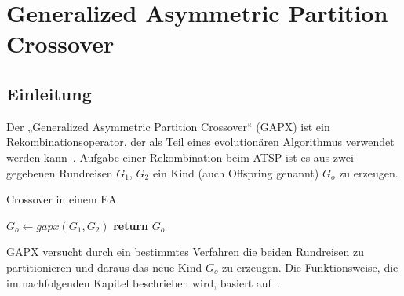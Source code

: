 \chapter{Generalized Asymmetric Partition Crossover}

\label{gapx_einleitung}
\section{Einleitung}
Der „Generalized Asymmetric Partition Crossover“ (GAPX) ist ein
Rekombinationsoperator, der als Teil eines evolutionären Algorithmus
verwendet werden kann~\cite{gapx}. Aufgabe einer Rekombination beim ATSP ist es aus
zwei gegebenen Rundreisen $G_1$, $G_2$ ein Kind (auch Offspring genannt)
$G_o$ zu erzeugen.


\begin{algorithm}
\caption{Crossover in einem EA}\label{alg:crossover_ea}
\begin{algorithmic}[1]
\Comment{}
\State $G_o\gets gapx(G_1,G_2)$
\State \textbf{return} $G_o$
\EndProcedure
\end{algorithmic}
\end{algorithm}
GAPX versucht durch ein bestimmtes Verfahren die beiden Rundreisen zu
partitionieren und daraus das neue Kind $G_o$ zu erzeugen. Die
Funktionsweise, die im nachfolgenden Kapitel beschrieben wird, basiert
auf~\cite{gapx}.



